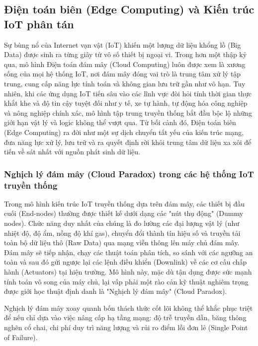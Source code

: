 \subsection{Điện toán biên (Edge Computing) và Kiến trúc IoT phân tán}
Sự bùng nổ của Internet vạn vật (IoT) khiến một lượng dữ liệu khổng lồ (Big Data) được sinh ra từng giây từ vô số thiết bị ngoại vi. Trong hơn một thập kỷ qua, mô hình Điện toán đám mây (Cloud Computing) luôn được xem là xương sống của mọi hệ thống IoT, nơi đám mây đóng vai trò là trung tâm xử lý tập trung, cung cấp năng lực tính toán và không gian lưu trữ gần như vô hạn. Tuy nhiên, khi các ứng dụng IoT tiến sâu vào các lĩnh vực đòi hỏi tính thời gian thực khắt khe và độ tin cậy tuyệt đối như y tế, xe tự hành, tự động hóa công nghiệp và nông nghiệp chính xác, mô hình tập trung truyền thống bắt đầu bộc lộ những giới hạn vật lý và logic không thể vượt qua. Từ bối cảnh đó, Điện toán biên (Edge Computing) ra đời như một sự dịch chuyển tất yếu của kiến trúc mạng, đưa năng lực xử lý, lưu trữ và ra quyết định rời khỏi trung tâm dữ liệu xa xôi để tiến về sát nhất với nguồn phát sinh dữ liệu.
\subsubsection{Nghịch lý đám mây (Cloud Paradox) trong các hệ thống IoT truyền thống}
Trong mô hình kiến trúc IoT truyền thống dựa trên đám mây, các thiết bị đầu cuối (End-nodes) thường được thiết kế dưới dạng các "nút thụ động" (Dummy nodes). Chức năng duy nhất của chúng là đo lường các đại lượng vật lý (như nhiệt độ, độ ẩm, nồng độ khí gas), chuyển đổi thành tín hiệu số và truyền tải toàn bộ dữ liệu thô (Raw Data) qua mạng viễn thông lên máy chủ đám mây. Đám mây sẽ tiếp nhận, chạy các thuật toán phân tích, so sánh với các ngưỡng an toàn và sau đó gửi ngược lại các lệnh điều khiển (Downlink) về các cơ cấu chấp hành (Actuators) tại hiện trường. Mô hình này, mặc dù tận dụng được sức mạnh tính toán vô song của máy chủ, lại vấp phải một rào cản kỹ thuật nghiêm trọng được giới học thuật định danh là "Nghịch lý đám mây" (Cloud Paradox).

Nghịch lý đám mây xoay quanh bốn thách thức cốt lõi không thể khắc phục triệt để nếu chỉ dựa vào việc nâng cấp hạ tầng mạng: độ trễ truyền dẫn, băng thông nghẽn cổ chai, chi phí duy trì năng lượng và rủi ro điểm lỗi đơn lẻ (Single Point of Failure).

